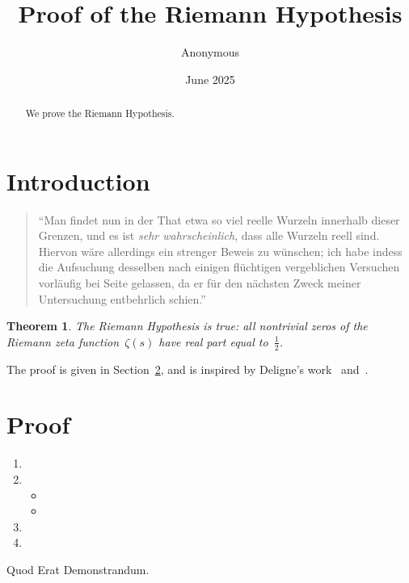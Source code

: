 \documentclass{amsart}
\title{Proof of the Riemann Hypothesis}
\author{Anonymous}
\date{June 2025}
\newtheorem{theorem}{Theorem}
\newcommand{\myemph}[1]{\textsl{#1}}
\begin{document}
\begin{abstract}
We prove the Riemann Hypothesis.
\end{abstract}

\maketitle
\tableofcontents

\section{Introduction}
\label{intro}

\begin{quote}
``Man findet nun in der That etwa so viel reelle Wurzeln innerhalb dieser Grenzen, und es ist \myemph{sehr wahrscheinlich}, dass alle Wurzeln reell sind.
Hiervon wäre allerdings ein strenger Beweis zu wünschen; ich habe indess die Aufsuchung desselben nach einigen flüchtigen vergeblichen Versuchen vorläufig bei Seite gelassen, da er für den nächsten Zweck meiner Untersuchung entbehrlich schien.'' \cite{Riemann}
\end{quote}

\begin{theorem}
\label{main}
The Riemann Hypothesis is true: all nontrivial zeros of the Riemann zeta function~$\zeta(s)$ have real part equal to~$\frac{1}{2}$.
\end{theorem}

The proof is given in Section~\ref{proof}, and is inspired by Deligne's work~\cite{MR340258} and~\cite{MR601520}.

\section{Proof}
\label{proof}

\begin{enumerate}
\item
\item
    \begin{itemize}
    \item
    \item
    \end{itemize}
\item
\item
\end{enumerate}
Quod Erat Demonstrandum. \qedsymbol



\end{document}

